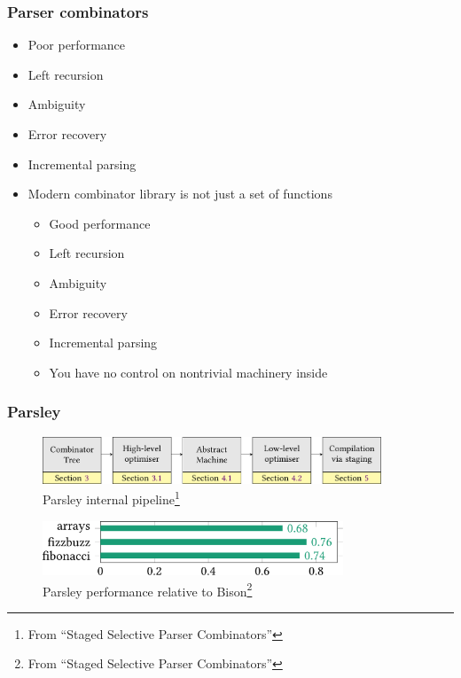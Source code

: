 \documentclass[xcolor=table,aspectratio=169]{beamer}
\begin{document}
\begin{frame}[fragile]
  \frametitle{Parser combinators}  
  \begin{itemize}
    \item[\faThumbsODown] Poor performance 
    \item[\faTimes] Left recursion
    \item[\faTimes] Ambiguity 
    \item[\faTimes] Error recovery
    \item[\faTimes] Incremental parsing  
    
    \item[\faLightbulbO] Modern combinator library is not just a set of functions
    \begin{itemize}
      \item[\faThumbsOUp] Good performance
      \item[\faPlus] Left recursion 
      \item[\faPlus] Ambiguity
      \item[\faQuestion] Error recovery
      \item[\faQuestion] Incremental parsing
      \item[\faThumbsODown] You have no control on nontrivial machinery inside
    \end{itemize}
  \end{itemize}
\end{frame}


\begin{frame}[fragile]
  \frametitle{Parsley}  
  \begin{figure}
    \includegraphics[width=0.9\textwidth]{pictures/ParsleyArch.pdf}
    \caption{Parsley internal pipeline\footnote{From ``Staged Selective Parser Combinators''}}  
  \end{figure}
  \begin{figure}
    \includegraphics[width=0.8\textwidth]{pictures/ParsleyBison.pdf}
    \caption{Parsley performance relative to Bison\footnote{From ``Staged Selective Parser Combinators''}}  
  \end{figure}
\end{frame}
\end{document}

